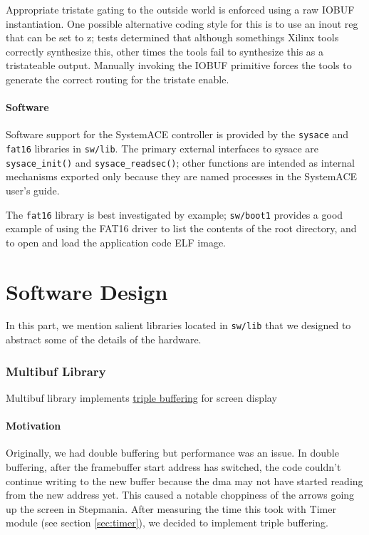 \documentclass[10pt]{article}
\begin{document}
Appropriate tristate gating to the outside world is enforced using a raw
IOBUF instantiation. One possible alternative coding style for this is to
use an inout reg that can be set to z; tests determined that although
somethings Xilinx tools correctly synthesize this, other times the tools
fail to synthesize this as a tristateable output. Manually invoking the
IOBUF primitive forces the tools to generate the correct routing for the
tristate enable.

\subsection{Software}

Software support for the SystemACE controller is provided by the
\texttt{sysace} and \texttt{fat16} libraries in \texttt{sw/lib}.  The
primary external interfaces to sysace are \texttt{sysace\_init()} and
\texttt{sysace\_readsec()}; other functions are intended as internal
mechanisms exported only because they are named processes in the SystemACE
user's guide.

The \texttt{fat16} library is best investigated by example;
\texttt{sw/boot1} provides a good example of using the FAT16 driver to list
the contents of the root directory, and to open and load the application
code ELF image.

\part{Software Design}

In this part, we mention salient libraries located in \texttt{sw/lib} that we 
designed to abstract some of the details of the hardware.

\section{Multibuf Library}

\label{sec:multibuf}

Multibuf library implements \href{http://en.wikipedia.org/wiki/Multiple_buffering#Triple_buffering}{triple buffering} for screen display 

\subsection{Motivation}

Originally, we had double buffering but performance was an issue. In double buffering, after the framebuffer start address has switched, the code couldn't continue writing to the new buffer because the dma may not have started reading from the new address yet. This caused a notable choppiness of the arrows going up the screen in Stepmania. After measuring the time this took with Timer module (see section \ref{sec:timer}), we decided to implement triple buffering. 
\end{document}
